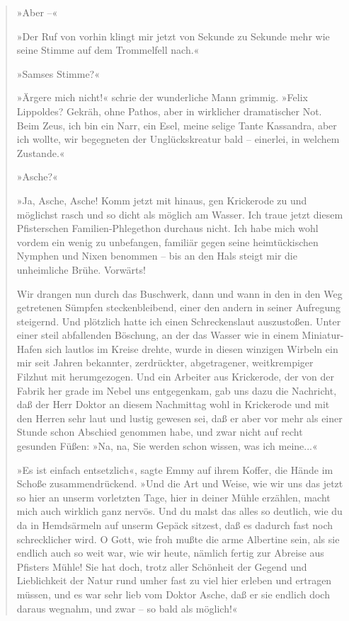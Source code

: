 \begin{verse}
»Aber –«

»Der Ruf von vorhin klingt mir jetzt von Sekunde zu Sekunde mehr
wie seine Stimme auf dem Trommelfell nach.«

»Samses Stimme?«

»Ärgere mich nicht!« schrie der wunderliche Mann grimmig. »Felix
Lippoldes? Gekräh, ohne Pathos, aber in wirklicher dramatischer
Not. Beim Zeus, ich bin ein Narr, ein Esel, meine selige Tante
Kassandra, aber ich wollte, wir begegneten der Unglückskreatur bald
– einerlei, in welchem Zustande.«

»Asche?«

»Ja, Asche, Asche! Komm jetzt mit hinaus, gen Krickerode zu und
möglichst rasch und so dicht als möglich am Wasser. Ich traue jetzt
diesem Pfisterschen Familien-Phlegethon durchaus nicht. Ich habe
mich wohl vordem ein wenig zu unbefangen, familiär gegen seine
heimtückischen Nymphen und Nixen benommen – bis an den Hals steigt
mir die unheimliche Brühe. Vorwärts!

Wir drangen nun durch das Buschwerk, dann und wann in den in den
Weg getretenen Sümpfen steckenbleibend, einer den andern in seiner
Aufregung steigernd. Und plötzlich hatte ich einen Schreckenslaut
auszustoßen. Unter einer steil abfallenden Böschung, an der das
Wasser wie in einem Miniatur-Hafen sich lautlos im Kreise drehte,
wurde in diesen winzigen Wirbeln ein mir seit Jahren bekannter,
zerdrückter, abgetragener, weitkrempiger Filzhut mit herumgezogen.
Und ein Arbeiter aus Krickerode, der von der Fabrik her grade im
Nebel uns entgegenkam, gab uns dazu die Nachricht, daß der Herr
Doktor an diesem Nachmittag wohl in Krickerode und mit den Herren
sehr laut und lustig gewesen sei, daß er aber vor mehr als einer
Stunde schon Abschied genommen habe, und zwar nicht auf recht
gesunden Füßen: »Na, na, Sie werden schon wissen, was ich
meine...«

»Es ist einfach entsetzlich«, sagte Emmy auf ihrem Koffer, die
Hände im Schoße zusammendrückend. »Und die Art und Weise, wie wir
uns das jetzt so hier an unserm vorletzten Tage, hier in deiner
Mühle erzählen, macht mich auch wirklich ganz nervös. Und du malst
das alles so deutlich, wie du da in Hemdsärmeln auf unserm Gepäck
sitzest, daß es dadurch fast noch schrecklicher wird. O Gott, wie
froh mußte die arme Albertine sein, als sie endlich auch so weit
war, wie wir heute, nämlich fertig zur Abreise aus Pfisters Mühle!
Sie hat doch, trotz aller Schönheit der Gegend und Lieblichkeit der
Natur rund umher fast zu viel hier erleben und ertragen müssen, und
es war sehr lieb vom Doktor Asche, daß er sie endlich doch daraus
wegnahm, und zwar – so bald als möglich!«


\end{verse}
